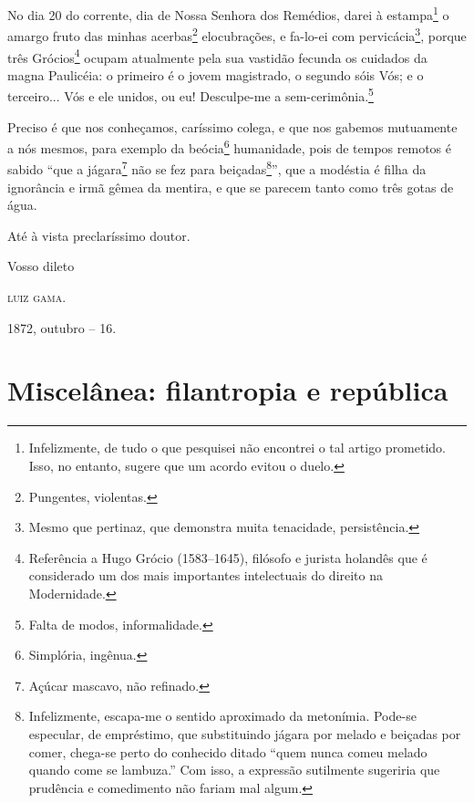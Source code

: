 No dia 20 do corrente, dia de Nossa Senhora dos Remédios, darei à
estampa\footnote{ Infelizmente, de tudo o que pesquisei não encontrei o
  tal artigo prometido. Isso, no entanto, sugere que um acordo evitou o
  duelo.} o amargo fruto das minhas acerbas\footnote{ Pungentes,
  violentas.} elocubrações, e fa-lo-ei com pervicácia\footnote{ Mesmo
  que pertinaz, que demonstra muita tenacidade, persistência.}, porque
três Grócios\footnote{ Referência a Hugo Grócio (1583--1645), filósofo e
  jurista holandês que é considerado um dos mais importantes
  intelectuais do direito na Modernidade.} ocupam atualmente pela sua
vastidão fecunda os cuidados da magna Paulicéia: o primeiro é o jovem
magistrado, o segundo sóis Vós; e o terceiro... Vós e ele unidos, ou eu!
Desculpe-me a sem-cerimônia.\footnote{ Falta de modos, informalidade.}

Preciso é que nos conheçamos, caríssimo colega, e que nos gabemos
mutuamente a nós mesmos, para exemplo da beócia\footnote{ Simplória,
  ingênua.} humanidade, pois de tempos remotos é sabido ``que a
jágara\footnote{ Açúcar mascavo, não refinado.} não se fez para
beiçadas\footnote{ Infelizmente, escapa-me o sentido aproximado da
  metonímia. Pode-se especular, de empréstimo, que substituindo jágara
  por melado e beiçadas por comer, chega-se perto do conhecido ditado
  ``quem nunca comeu melado quando come se lambuza.'' Com isso, a
  expressão sutilmente sugeriria que prudência e comedimento não fariam
  mal algum.}'', que a modéstia é filha da ignorância e irmã gêmea da
mentira, e que se parecem tanto como três gotas de água.

Até à vista preclaríssimo doutor.

Vosso dileto

\textsc{luiz gama}.

1872, outubro -- 16.

\part{Miscelânea: filantropia e república}

